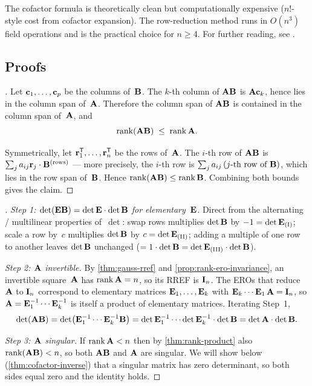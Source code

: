 \begin{remark}
The cofactor formula is theoretically clean but computationally
expensive ($n!$-style cost from cofactor expansion). The row-reduction
method runs in $O(n^3)$ field operations and is the practical choice
for $n \ge 4$. For further reading, see \cite{Beklemishev2025}.
\end{remark}

\subsection*{Proofs}

\begin{proof}[]
Let $\mathbf{c}_1, \dots, \mathbf{c}_p$ be the columns of~$\mathbf{B}$. The
$k$-th column of $\mathbf{A}\mathbf{B}$ is $\mathbf{A}\mathbf{c}_k$, hence lies
in the column span of~$\mathbf{A}$. Therefore the column span of
$\mathbf{A}\mathbf{B}$ is contained in the column span of~$\mathbf{A}$, and
\[
  \operatorname{rank}(\mathbf{A}\mathbf{B}) \;\le\; \operatorname{rank} \mathbf{A}.
\]

Symmetrically, let $\mathbf{r}_1^{\mathsf{T}}, \dots, \mathbf{r}_n^{\mathsf{T}}$ be the rows
of~$\mathbf{A}$. The $i$-th row of $\mathbf{A}\mathbf{B}$ is
$\sum_{j} a_{ij} \mathbf{r}_j \cdot \mathbf{B}^{\text{(rows)}}$ — more
precisely, the $i$-th row is $\sum_j a_{ij}\,(\mbox{$j$-th row of }\mathbf{B})$,
which lies in the row span of~$\mathbf{B}$. Hence
$\operatorname{rank}(\mathbf{A}\mathbf{B}) \le \operatorname{rank} \mathbf{B}$. Combining both bounds gives
the claim.
\end{proof}

\begin{proof}[]
\emph{Step 1: $\det(\mathbf{E}\mathbf{B}) = \det \mathbf{E} \cdot \det \mathbf{B}$
for elementary~$\mathbf{E}$.} Direct from the alternating / multilinear
properties of~$\det$:
swap rows multiplies $\det \mathbf{B}$ by $-1 = \det \mathbf{E}_{\text{(I)}}$;
scale a row by~$c$ multiplies $\det \mathbf{B}$ by $c = \det \mathbf{E}_{\text{(II)}}$;
adding a multiple of one row to another leaves $\det \mathbf{B}$ unchanged
($= 1 \cdot \det \mathbf{B} = \det \mathbf{E}_{\text{(III)}} \cdot \det \mathbf{B}$).

\emph{Step 2: $\mathbf{A}$ invertible.} By
\cref{thm:gauss-rref} and \cref{prop:rank-ero-invariance}, an
invertible square~$\mathbf{A}$ has $\operatorname{rank} \mathbf{A} = n$, so its RREF is
$\mathbf{I}_n$. The EROs that reduce~$\mathbf{A}$ to $\mathbf{I}_n$ correspond
to elementary matrices $\mathbf{E}_1, \dots, \mathbf{E}_k$ with
$\mathbf{E}_k \cdots \mathbf{E}_1\,\mathbf{A} = \mathbf{I}_n$, so
$\mathbf{A} = \mathbf{E}_1^{-1} \cdots \mathbf{E}_k^{-1}$ is itself a product of
elementary matrices. Iterating Step~1,
\[
  \det(\mathbf{A}\mathbf{B})
  = \det\bigl(\mathbf{E}_1^{-1} \cdots \mathbf{E}_k^{-1} \mathbf{B}\bigr)
  = \det \mathbf{E}_1^{-1} \cdots \det \mathbf{E}_k^{-1} \cdot \det \mathbf{B}
  = \det \mathbf{A} \cdot \det \mathbf{B}.
\]

\emph{Step 3: $\mathbf{A}$ singular.} If $\operatorname{rank} \mathbf{A} < n$ then by
\cref{thm:rank-product} also $\operatorname{rank}(\mathbf{A}\mathbf{B}) < n$, so both
$\mathbf{A}\mathbf{B}$ and $\mathbf{A}$ are singular. We will show below
(\cref{thm:cofactor-inverse}) that a singular matrix has zero
determinant, so both sides equal zero and the identity holds.
\end{proof}

